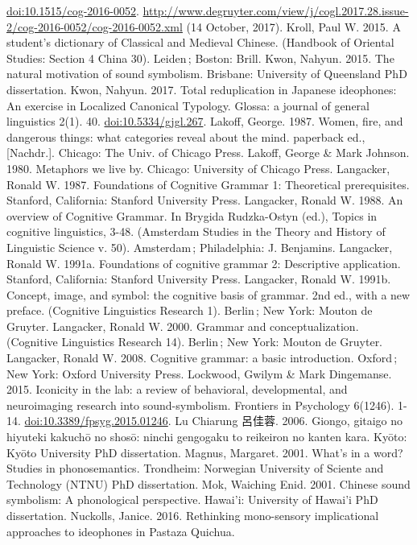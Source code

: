 \url{doi:10.1515/cog-2016-0052}.
\url{http://www.degruyter.com/view/j/cogl.2017.28.issue-2/cog-2016-0052/cog-2016-0052.xml}
(14 October, 2017). Kroll, Paul W. 2015. A student's dictionary of
Classical and Medieval Chinese. (Handbook of Oriental Studies: Section 4
China 30). Leiden\,; Boston: Brill. Kwon, Nahyun. 2015. The natural
motivation of sound symbolism. Brisbane: University of Queensland PhD
dissertation. Kwon, Nahyun. 2017. Total reduplication in Japanese
ideophones: An exercise in Localized Canonical Typology. Glossa: a
journal of general linguistics 2(1). 40. \url{doi:10.5334/gjgl.267}.
Lakoff, George. 1987. Women, fire, and dangerous things: what categories
reveal about the mind. paperback ed., {[}Nachdr.{]}. Chicago: The Univ.
of Chicago Press. Lakoff, George \& Mark Johnson. 1980. Metaphors we
live by. Chicago: University of Chicago Press. Langacker, Ronald W.
1987. Foundations of Cognitive Grammar 1: Theoretical prerequisites.
Stanford, California: Stanford University Press. Langacker, Ronald W.
1988. An overview of Cognitive Grammar. In Brygida Rudzka-Ostyn (ed.),
Topics in cognitive linguistics, 3-48. (Amsterdam Studies in the Theory
and History of Linguistic Science v. 50). Amsterdam\,; Philadelphia: J.
Benjamins. Langacker, Ronald W. 1991a. Foundations of cognitive grammar
2: Descriptive application. Stanford, California: Stanford University
Press. Langacker, Ronald W. 1991b. Concept, image, and symbol: the
cognitive basis of grammar. 2nd ed., with a new preface. (Cognitive
Linguistics Research 1). Berlin\,; New York: Mouton de Gruyter.
Langacker, Ronald W. 2000. Grammar and conceptualization. (Cognitive
Linguistics Research 14). Berlin\,; New York: Mouton de Gruyter.
Langacker, Ronald W. 2008. Cognitive grammar: a basic introduction.
Oxford\,; New York: Oxford University Press. Lockwood, Gwilym \& Mark
Dingemanse. 2015. Iconicity in the lab: a review of behavioral,
developmental, and neuroimaging research into sound-symbolism. Frontiers
in Psychology 6(1246). 1-14. \url{doi:10.3389/fpsyg.2015.01246}. Lu
Chiarung 呂佳蓉. 2006. Giongo, gitaigo no hiyuteki kakuchō no shosō:
ninchi gengogaku to reikeiron no kanten kara. Kyōto: Kyōto University
PhD dissertation. Magnus, Margaret. 2001. What's in a word? Studies in
phonosemantics. Trondheim: Norwegian University of Sciente and
Technology (NTNU) PhD dissertation. Mok, Waiching Enid. 2001. Chinese
sound symbolism: A phonological perspective. Hawai'i: University of
Hawai'i PhD dissertation. Nuckolls, Janice. 2016. Rethinking
mono-sensory implicational approaches to ideophones in Pastaza Quichua.

